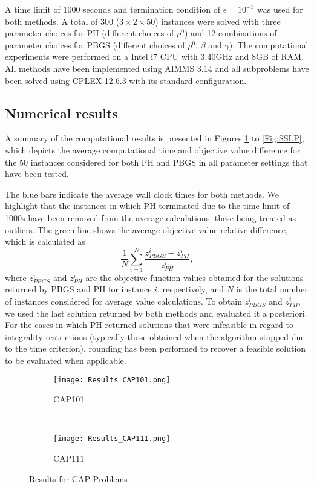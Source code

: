 \documentclass[preprint, 1p, review]{elsarticle}
\begin{document}
A time limit of 1000 seconds and termination condition of $\epsilon = 10^{-3} $ was used for both methods. A total of 300 ($3\times2\times50$) instances were solved with three parameter choices for PH (different choices of $\rho^0$) and 12 combinations of parameter choices for PBGS (different choices of $\rho^0$, $\beta$ and $\gamma$). The computational experiments were performed on a Intel i7 CPU with 3.40GHz and 8GB of RAM. All methods have been implemented using AIMMS 3.14 and all subproblems have been solved using CPLEX 12.6.3 with its standard configuration. 

\subsection{Numerical results}

A summary of the computational results is presented in Figures \ref{Fig:CAP} to \ref{Fig:SSLP}, which depicts the average computational time and objective value difference for the 50 instances considered for both PH and PBGS in all parameter settings that have been tested. 

The blue bars indicate the average wall clock times for both methods. We highlight that the instances in which PH terminated due to the time limit of 1000s have been removed from the average calculations, these being treated as outliers. The green line shows the average objective value relative difference, which is calculated as
%
$$\frac{1}{N}\sum_{i=1}^N\frac{z^i_{PBGS} - z^i_{PH}}{z^i_{PH}},$$ 
%
where $z^i_{PBGS}$ and $z^i_{PH}$ are the objective function values obtained for the solutions returned by PBGS and PH for instance $i$, respectively, and $N$ is the total number of instances considered for average value calculations. To obtain $z^i_{PBGS}$ and $z^i_{PH}$, we used the last solution returned by both methods and evaluated it a posteriori. For the cases in which PH returned solutions that were infeasible in regard to integrality restrictions (typically those obtained when the algorithm stopped due to the time criterion), rounding has been performed to recover a feasible solution to be evaluated when applicable.  

\begin{figure}[H]
    \begin{subfigure}[b]{0.5\textwidth}
        \texttt{[image: Results\_CAP101.png]}
        \caption{CAP101} 
    \end{subfigure}
    ~
    \begin{subfigure}[b]{0.5\textwidth}
        \texttt{[image: Results\_CAP111.png]}
        \caption{CAP111} 
    \end{subfigure}
    \caption{Results for CAP Problems}
    \label{Fig:CAP}
\end{figure}
\end{document}
